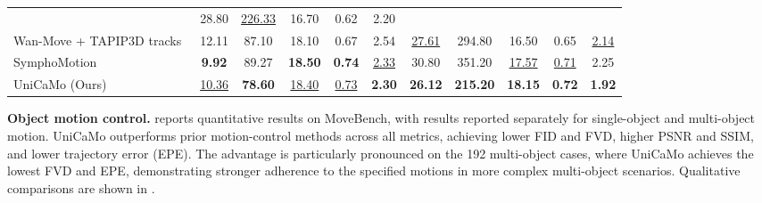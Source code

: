 \ifdefined\arxivbuild\else\documentclass{article}\fi %
\begin{document}
\begin{table}[t]
{\begin{tabular}{l|ccccc|ccccc}
& 28.80  & \underline{226.33} & 16.70 & 0.62 & 2.20 \\
Wan-Move + TAPIP3D tracks~\citep{chu2025wan}
& 12.11 &  87.10 & 18.10 & 0.67 & 2.54
& \underline{27.61}  & 294.80 & 16.50 & 0.65 & \underline{2.14} \\
SymphoMotion~\citep{zhang2026symphomotion}
& \textbf{9.92} & 89.27 & \textbf{18.50} & \textbf{0.74} & \underline{2.33} & 30.80 & 351.20 & \underline{17.57} & \underline{0.71} & 2.25 \\
UniCaMo (Ours)
& \underline{10.36} & \textbf{78.60} & \underline{18.40} & \underline{0.73} & \textbf{2.30}
& \textbf{26.12}  & \textbf{215.20} & \textbf{18.15} & \textbf{0.72} & \textbf{1.92} \\
\bottomrule
\end{tabular}%
}

\end{table}
\noindent\textbf{Object motion control.}
 reports quantitative results on MoveBench, with results reported separately for single-object and multi-object motion. UniCaMo outperforms prior motion-control methods across all metrics, achieving lower FID and FVD, higher PSNR and SSIM, and lower trajectory error (EPE). The advantage is particularly pronounced on the 192 multi-object cases, where UniCaMo achieves the lowest FVD and EPE, demonstrating stronger adherence to the specified motions in more complex multi-object scenarios. Qualitative comparisons are shown in .

\end{document}
